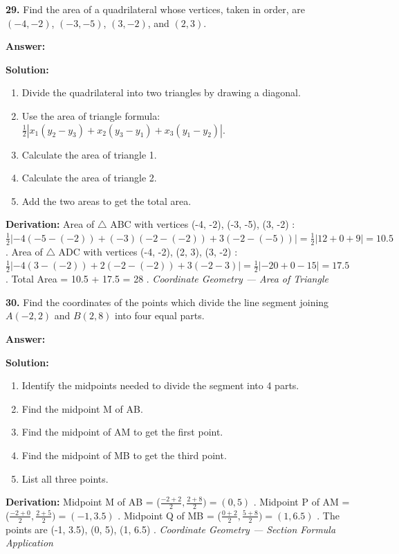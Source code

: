 \documentclass[12pt,a4paper]{exam}
\newcommand{\fitmath}[1]{%
  \sbox{\schmathbox}{$\displaystyle #1$}%
  \ifdim\wd\schmathbox>\linewidth
    \resizebox{\linewidth}{!}{\usebox{\schmathbox}}%
  \else
    \usebox{\schmathbox}%
  \fi}
\begin{document}
\begin{questions}
\question \textbf{29.} Find the area of a quadrilateral whose vertices, taken in order, are $(-4, -2)$, $(-3, -5)$, $(3, -2)$, and $(2, 3)$.

\textbf{Answer:}
\begin{center}
\fitmath{28 sq. \text{units}}
\end{center}

\textbf{Solution:}
\begin{enumerate}
  \item Divide the quadrilateral into two triangles by drawing a diagonal.
  \item Use the area of triangle formula: $\frac{1}{2}|x_1(y_2 - y_3) + x_2(y_3 - y_1) + x_3(y_1 - y_2)|$.
  \item Calculate the area of triangle 1.
  \item Calculate the area of triangle 2.
  \item Add the two areas to get the total area.
\end{enumerate}
\textbf{Derivation:}
Area of  $\triangle$ ABC  with vertices  (-4, -2), (-3, -5), (3, -2) :  $\frac{1}{2}|-4(-5 - (-2)) + (-3)(-2 - (-2)) + 3(-2 - (-5))| = \frac{1}{2}|12 + 0 + 9| = 10.5$ . Area of  $\triangle$ ADC  with vertices  (-4, -2), (2, 3), (3, -2) :  $\frac{1}{2}|-4(3 - (-2)) + 2(-2 - (-2)) + 3(-2 - 3)| = \frac{1}{2}|-20 + 0 - 15| = 17.5$ . Total Area =  10.5 + 17.5 = 28 .
\hfill \textit{Coordinate Geometry — Area of Triangle}
\vspace{0.3cm}

\question \textbf{30.} Find the coordinates of the points which divide the line segment joining $A(-2, 2)$ and $B(2, 8)$ into four equal parts.

\textbf{Answer:}
\begin{center}
\fitmath{(-1, 3.5), (0, 5), (1, 6.5)}
\end{center}

\textbf{Solution:}
\begin{enumerate}
  \item Identify the midpoints needed to divide the segment into 4 parts.
  \item Find the midpoint M of AB.
  \item Find the midpoint of AM to get the first point.
  \item Find the midpoint of MB to get the third point.
  \item List all three points.
\end{enumerate}
\textbf{Derivation:}
Midpoint  M  of  AB = ($\frac{-2+2}{2}, \frac{2+8}{2}) = (0, 5)$ . Midpoint  P  of  AM = ($\frac{-2+0}{2}, \frac{2+5}{2}) = (-1, 3.5)$ . Midpoint  Q  of  MB = ($\frac{0+2}{2}, \frac{5+8}{2}) = (1, 6.5)$ . The points are  (-1, 3.5), (0, 5), (1, 6.5) .
\hfill \textit{Coordinate Geometry — Section Formula Application}
\vspace{0.3cm}


\end{questions}
\end{document}
